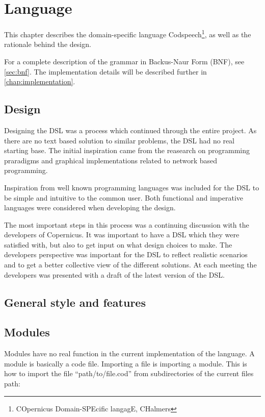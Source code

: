 \chapter{Language}\label{chap:language}
This chapter describes the domain-specific language
Codspeech\footnote{COpernicus Domain-SPEcific langagE, CHalmers}, as
well as the rationale behind the design.

For a complete description of the grammar in Backus-Naur Form (BNF),
see \autoref{sec:bnf}. The implementation details will be described
further in \autoref{chap:implementation}.


\section{Design}
Designing the DSL was a process which continued through the entire
project. As there are no text based solution to similar problems, the
DSL had no real starting base. The initial inspiration came from the
reasearch on programming praradigms and graphical implementations
related to network based programming.

Inspiration from well known programming languages was included for the
DSL to be simple and intuitive to the common user. Both functional and
imperative languages were considered when developing the design.

The most important steps in this process was a continuing discussion
with the developers of Copernicus. It was important to have a DSL
which they were satisfied with, but also to get input on what design
choices to make. The developers perspective was important for the DSL
to reflect realistic scenarios and to get a better collective view of
the different solutions. At each meeting the developers was presented
with a draft of the latest version of the DSL.

\section{General style and features}




\section{Modules}
Modules have no real function in the current implementation of the
language. A module is basically a code file. Importing a file is
importing a module. This is how to import the file
``path/to/file.cod'' from subdirectories of the current files path:

